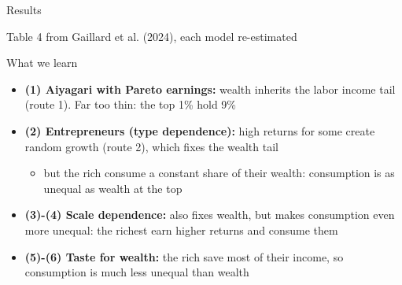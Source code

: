 \documentclass[10pt,english,10pt]{beamer}
\begin{document}
\begin{frame}{Results}
\begin{center}
\end{center}
{\footnotesize Table 4 from Gaillard et al. (2024), each model re-estimated}
\end{frame}

\begin{frame}{What we learn}
\begin{itemize}
\item \textbf{(1) Aiyagari with Pareto earnings:} wealth inherits the labor income tail (route 1). Far too thin: the top 1\% hold 9\%
\item \textbf{(2) Entrepreneurs (type dependence):} high returns for some create random growth (route 2), which fixes the wealth tail
\begin{itemize}
\item but the rich consume a constant share of their wealth: consumption is as unequal as wealth at the top
\end{itemize}
\item \textbf{(3)-(4) Scale dependence:} also fixes wealth, but makes consumption even more unequal: the richest earn higher returns and consume them
\item \textbf{(5)-(6) Taste for wealth:} the rich save most of their income, so consumption is much less unequal than wealth
\end{itemize}
\end{frame}
\end{document}
